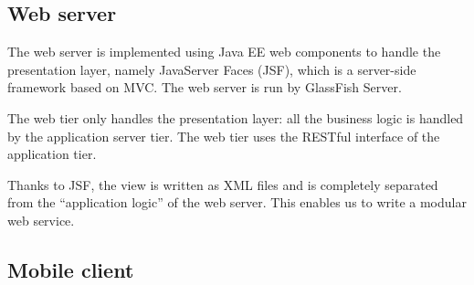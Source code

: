 \subsection{Web server}
The web server is implemented using Java EE web components to handle the presentation layer, namely JavaServer Faces (JSF), which is a server-side framework based on MVC.
The web server is run by GlassFish Server.

The web tier only handles the presentation layer: all the business logic is handled by the application server tier. The web tier uses the RESTful interface of the application tier.

Thanks to JSF, the view is written as XML files and is completely separated from the ``application logic'' of the web server. This enables us to write a modular web service.

\subsection{Mobile client}
